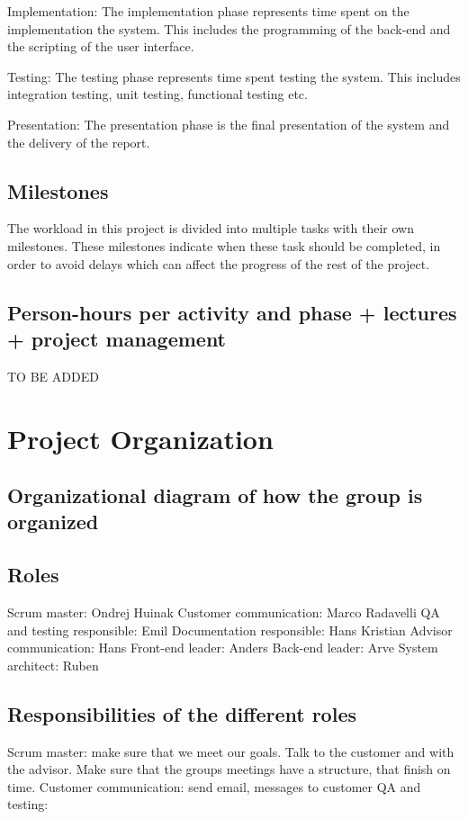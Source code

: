 \documentclass[11pt,a4paper,titlepage,oneside]{report}
\begin{document}
Implementation: The implementation phase represents time spent on the implementation the system. This includes the programming of the back-end and the scripting of the user interface.
          
Testing: The testing phase represents time spent testing the system. This includes integration testing, unit testing, functional testing etc.
          
Presentation: The presentation phase is the final presentation of the system and the delivery of the report.

\subsection{Milestones}
The workload in this project is divided into multiple tasks with their own milestones. These milestones indicate when these task should be completed, in order to avoid delays which can affect the progress of the rest of the project.

\subsection{Person-hours per activity and phase + lectures + project management}
TO BE ADDED

\section{Project Organization}
\subsection{Organizational diagram of how the group is organized}

\subsection{Roles}
Scrum master: Ondrej Huinak
Customer communication: Marco Radavelli
QA and testing responsible: Emil 
Documentation responsible: Hans Kristian
Advisor communication: Hans 
Front-end leader: Anders
Back-end leader: Arve
System architect: Ruben

\subsection{Responsibilities of the different roles}
Scrum master: make sure that we meet our goals. Talk to the customer and with the advisor. Make sure that the groups meetings have a structure, that finish on time.
Customer communication: send email, messages to customer
QA and testing: 
\end{document}
